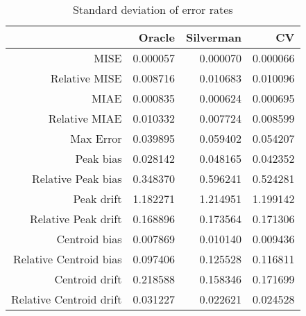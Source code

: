 \begin{table}[ht]
\centering
\begin{tabular}{rrrr}
  \hline
 & Oracle & Silverman & CV \\ 
  \hline
MISE & 0.000057 & 0.000070 & 0.000066 \\ 
  Relative MISE & 0.008716 & 0.010683 & 0.010096 \\ 
  MIAE & 0.000835 & 0.000624 & 0.000695 \\ 
  Relative MIAE & 0.010332 & 0.007724 & 0.008599 \\ 
  Max Error & 0.039895 & 0.059402 & 0.054207 \\ 
  Peak bias & 0.028142 & 0.048165 & 0.042352 \\ 
  Relative Peak bias & 0.348370 & 0.596241 & 0.524281 \\ 
  Peak drift & 1.182271 & 1.214951 & 1.199142 \\ 
  Relative Peak drift & 0.168896 & 0.173564 & 0.171306 \\ 
  Centroid bias & 0.007869 & 0.010140 & 0.009436 \\ 
  Relative Centroid bias & 0.097406 & 0.125528 & 0.116811 \\ 
  Centroid drift & 0.218588 & 0.158346 & 0.171699 \\ 
  Relative Centroid drift & 0.031227 & 0.022621 & 0.024528 \\ 
   \hline
\end{tabular}
\caption{Standard deviation of error rates} 
\label{tbl:stddev_error_rates}
\end{table}
